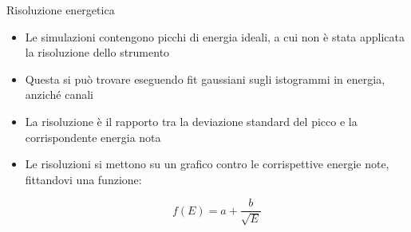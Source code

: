 \documentclass [xcolor=svgnames] {beamer}
\begin{document}
\begin{frame}{Risoluzione energetica}%
		\begin{itemize}
				\item Le simulazioni contengono picchi di energia ideali, a cui non è stata applicata la risoluzione dello strumento
				\item Questa si può trovare eseguendo fit gaussiani sugli istogrammi in energia, anziché canali
				\item La risoluzione è il rapporto tra la deviazione standard del picco e la corrispondente energia nota
				\item Le risoluzioni si mettono su un grafico contro le corrispettive energie note, fittandovi una funzione:
				
				\begin{equation*}
						f(E) = a + \dfrac{b}{\sqrt{E}}
					\end{equation*}
			\end{itemize}
\end{frame}
\end{document}
